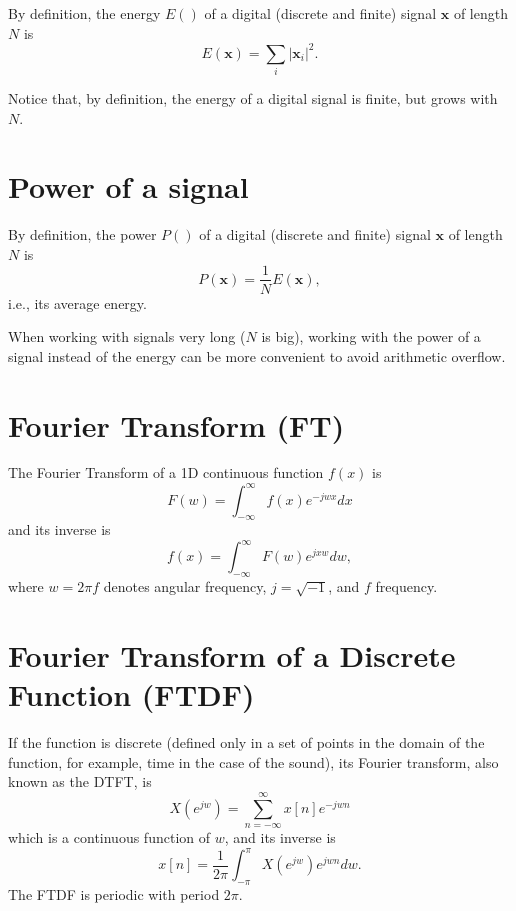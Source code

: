By definition, the energy $E()$ of a digital (discrete and finite) signal
$\mathbf{x}$ of length $N$ is
\begin{equation}
  E(\mathbf{x}) = \sum_{i}|\mathbf{x}_i|^2.
\end{equation}

Notice that, by definition, the energy of a digital signal is finite,
but grows with $N$.


\section{Power of a signal}
\label{sec:power_signal}

By definition, the power $P()$ of a digital (discrete and finite) signal
$\mathbf{x}$ of length $N$ is
\begin{equation}
  P(\mathbf{x}) = \frac{1}{N}E(\mathbf{x}),
\end{equation}
i.e., its average energy.

When working with signals very long ($N$ is big), working with the
power of a signal instead of the energy can be more convenient to
avoid arithmetic overflow.


\section{Fourier Transform (FT)}
\label{sec:Fourier_transform}

The Fourier Transform of a 1D continuous function $f(x)$ is
\begin{equation}
  F(w) = \int_{-\infty}^{\infty}f(x)e^{-jwx}dx
  \label{eq:FT}
\end{equation}
and its inverse is
\begin{equation}
  f(x) = \int_{-\infty}^{\infty}F(w)e^{jxw}dw,
\end{equation}
where $w=2\pi f$ denotes angular frequency, $j=\sqrt{-1}$, and $f$ frequency.


\section{Fourier Transform of a Discrete Function (FTDF)}
\label{sec:FTDF}

If the function is discrete (defined only in a set of points in the
domain of the function, for example, time in the case of the sound),
its Fourier transform, also known as the \gls{DTFT}, is
\begin{equation}
  X(e^{jw}) = \sum_{n=-\infty}^{\infty}x[n]e^{-jwn}
\end{equation}
which is a continuous function of $w$, and its inverse is
\begin{equation}
  x[n] = \frac{1}{2\pi}\int_{-\pi}^{\pi}X(e^{jw})e^{jwn}dw.
\end{equation}
The \acrshort{FTDF} is periodic with period $2\pi$.

